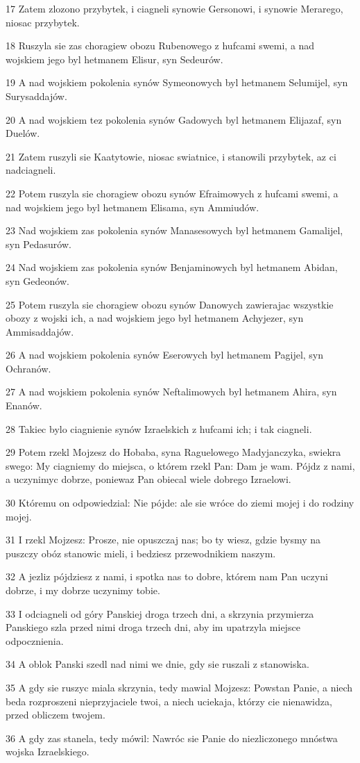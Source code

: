 \par 17 Zatem zlozono przybytek, i ciagneli synowie Gersonowi, i synowie Merarego, niosac przybytek.
\par 18 Ruszyla sie zas choragiew obozu Rubenowego z hufcami swemi, a nad wojskiem jego byl hetmanem Elisur, syn Sedeurów.
\par 19 A nad wojskiem pokolenia synów Symeonowych byl hetmanem Selumijel, syn Surysaddajów.
\par 20 A nad wojskiem tez pokolenia synów Gadowych byl hetmanem Elijazaf, syn Duelów.
\par 21 Zatem ruszyli sie Kaatytowie, niosac swiatnice, i stanowili przybytek, az ci nadciagneli.
\par 22 Potem ruszyla sie choragiew obozu synów Efraimowych z hufcami swemi, a nad wojskiem jego byl hetmanem Elisama, syn Ammiudów.
\par 23 Nad wojskiem zas pokolenia synów Manasesowych byl hetmanem Gamalijel, syn Pedasurów.
\par 24 Nad wojskiem zas pokolenia synów Benjaminowych byl hetmanem Abidan, syn Gedeonów.
\par 25 Potem ruszyla sie choragiew obozu synów Danowych zawierajac wszystkie obozy z wojski ich, a nad wojskiem jego byl hetmanem Achyjezer, syn Ammisaddajów.
\par 26 A nad wojskiem pokolenia synów Eserowych byl hetmanem Pagijel, syn Ochranów.
\par 27 A nad wojskiem pokolenia synów Neftalimowych byl hetmanem Ahira, syn Enanów.
\par 28 Takiec bylo ciagnienie synów Izraelskich z hufcami ich; i tak ciagneli.
\par 29 Potem rzekl Mojzesz do Hobaba, syna Raguelowego Madyjanczyka, swiekra swego: My ciagniemy do miejsca, o którem rzekl Pan: Dam je wam. Pójdz z nami, a uczynimyc dobrze, poniewaz Pan obiecal wiele dobrego Izraelowi.
\par 30 Któremu on odpowiedzial: Nie pójde: ale sie wróce do ziemi mojej i do rodziny mojej.
\par 31 I rzekl Mojzesz: Prosze, nie opuszczaj nas; bo ty wiesz, gdzie bysmy na puszczy obóz stanowic mieli, i bedziesz przewodnikiem naszym.
\par 32 A jezliz pójdziesz z nami, i spotka nas to dobre, którem nam Pan uczyni dobrze, i my dobrze uczynimy tobie.
\par 33 I odciagneli od góry Panskiej droga trzech dni, a skrzynia przymierza Panskiego szla przed nimi droga trzech dni, aby im upatrzyla miejsce odpocznienia.
\par 34 A oblok Panski szedl nad nimi we dnie, gdy sie ruszali z stanowiska.
\par 35 A gdy sie ruszyc miala skrzynia, tedy mawial Mojzesz: Powstan Panie, a niech beda rozproszeni nieprzyjaciele twoi, a niech uciekaja, którzy cie nienawidza, przed obliczem twojem.
\par 36 A gdy zas stanela, tedy mówil: Nawróc sie Panie do niezliczonego mnóstwa wojska Izraelskiego.

